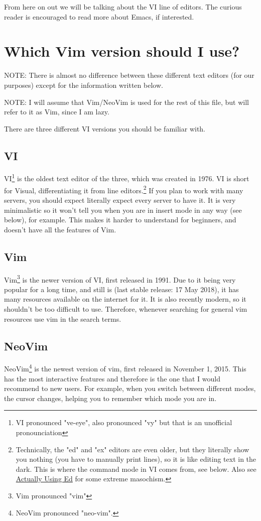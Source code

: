 \documentclass[11pt]{article}
\begin{document}
From here on out we will be talking about the VI line of editors. The curious
reader is encouraged to read more about Emacs, if interested.
\section{Which Vim version should I use?}
\label{sec:org3657a21}
NOTE: There is almost no difference between these different text editors (for
our purposes) except for the information written below.

NOTE: I will assume that Vim/NeoVim is used for the rest of this file, but will
refer to it as Vim, since I am lazy.

There are three different VI versions you should be familiar with.
\subsection{VI}
\label{sec:org14758f2}
VI\footnote{VI pronounced "ve-eye", also pronounced "vy" but that is an unofficial pronounciation} is the oldest text editor of the three, which was created in 1976. VI
is short for Visual, differentiating it from line editors.\footnote{Technically, the "ed" and "ex" editors are even older, but they literally
show you nothing (you have to manually print lines), so it is like editing text
in the dark. This is where the command mode in VI comes from, see below. Also see
\href{https://sanctum.geek.nz/arabesque/actually-using-ed/}{Actually Using Ed} for some extreme masochism.} If you plan to
work with many servers, you should expect literally expect every server to have
it. It is very minimalistic so it won't tell you when you are in insert mode in
any way (see below), for example. This makes it harder to understand for
beginners, and doesn't have all the features of Vim.
\subsection{Vim}
\label{sec:org55e0d6e}
Vim\footnote{Vim pronounced "vim"} is the newer version of VI, first released in 1991. Due to it being
very popular for a long time, and still is (last stable release: 17 May 2018),
it has many resources available on the internet for it. It is also recently
modern, so it shouldn't be too difficult to use. Therefore, whenever searching
for general vim resources use vim in the search terms.
\subsection{NeoVim}
\label{sec:org1334eb1}
NeoVim\footnote{NeoVim pronounced "neo-vim".} is the newest version of vim, first released in November 1, 2015.
This has the most interactive features and therefore is the one that I would
recommend to new users. For example, when you switch between different modes,
the cursor changes, helping you to remember which mode you are in.
\end{document}
